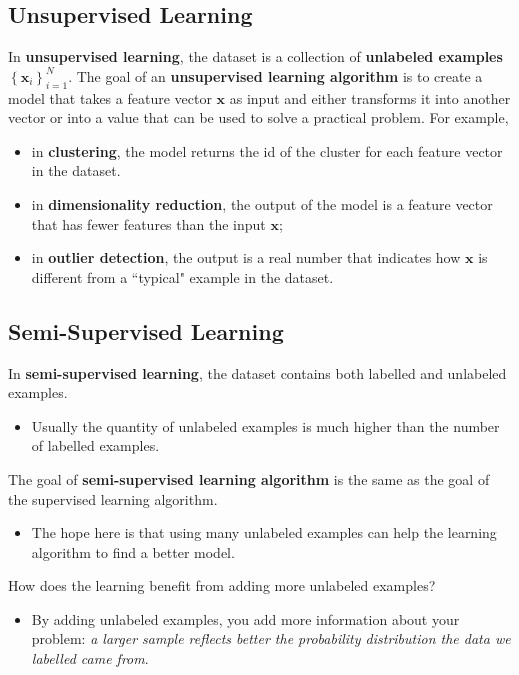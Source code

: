 \subsection{Unsupervised Learning}
In \textbf{unsupervised learning}, the dataset is a collection of \textbf{unlabeled examples} $\left\{\mathbf{x}_i\right\}_{i=1}^N$. The goal of an \textbf{unsupervised learning algorithm} is to create a model that takes a feature vector $\mathbf{x}$ as input and either transforms it into another vector or into a value that can be used to solve a practical problem. For example,
\begin{itemize}
	\item in \textbf{clustering}, the model returns the id of the cluster for each feature vector in the dataset.
	\item in \textbf{dimensionality reduction}, the output of the model is a feature vector that has fewer features than the input $\mathbf{x}$;
	\item in \textbf{outlier detection}, the output is a real number that indicates how $\mathbf{x}$ is different from a ``typical" example in the dataset.
\end{itemize}
\subsection{Semi-Supervised Learning}
In \textbf{semi-supervised learning}, the dataset contains both labelled and unlabeled examples.
\begin{itemize}
	\item Usually the quantity of unlabeled examples is much higher than the number of labelled examples.
\end{itemize}
The goal of \textbf{semi-supervised learning algorithm} is the same as the goal of the supervised learning algorithm.
\begin{itemize}
	\item The hope here is that using many unlabeled examples can help the learning algorithm to find a better model.
\end{itemize}
How does the learning benefit from adding more unlabeled examples?
\begin{itemize}
	\item By adding unlabeled examples, you add more information about your problem:\textit{ a larger sample reflects better the probability distribution the data we labelled came from}.
\end{itemize}

